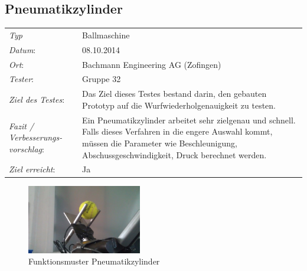 \subsection{Pneumatikzylinder}

\begin{tabular}{p{3.6cm}p{9.4cm}}
\textit{Typ}              & Ballmaschine \\ 
\textit{Datum}:           & 08.10.2014   \\
\textit{Ort}:             & Bachmann Engineering AG (Zofingen) \\
\textit{Tester}:          &  Gruppe 32\\
\textit{Ziel des Testes}: & Das Ziel dieses Testes bestand darin, den gebauten Prototyp auf die Wurfwiederholgenauigkeit zu testen. \\
\textit{Fazit / Verbesserungs-\newline vorschlag}: & Ein Pneumatikzylinder arbeitet sehr zielgenau und schnell. Falls dieses Verfahren in die engere Auswahl kommt, müssen die Parameter wie Beschleunigung, Abschussgeschwindigkeit, Druck berechnet werden.\\ 
\textit{Ziel erreicht}:& Ja\\
\end{tabular}

\begin{figure}[h!]
	\includegraphics[width=5cm]{Funktionstests/Bilder/PneumatikzylinderBild.jpg}
	\centering
	\caption{Funktionsmuster Pneumatikzylinder} 
\label{abb:PneumatikzylinderBild}
\end{figure}